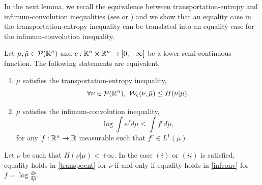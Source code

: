 \documentclass[a4paper,oneside,11pt]{article}
\begin{document}
 In the next lemma, we recall the equivalence between transportation-entropy and infimum-convolution inequalities (see \cite[Corollary 3.1]{GL} or \cite[Theorem 5.26]{Villani}) and we show that an equality case in the transportation-entropy inequality can be translated into an equality case for the infimum-convolution inequality.


\begin{Pro}\label{duality}
Let $\mu,\tilde \mu \in \mathcal{P}(\mathbb{R}^n)$ and $c : \mathbb{R}^n \times \mathbb{R}^n \to [0,+\infty]$ be a lower semi-continuous function. The following statements are equivalent.

\begin{enumerate}
\item[(i).] $\mu$ satisfies the transportation-entropy inequality,
\begin{equation} \label{transpoent}\forall \nu \in \mathcal{P}(\mathbb{R}^n), \  \mathcal{W}_c(\nu,\tilde \mu) \leq H(\nu| \mu). \end{equation}


\item[ (ii).] $\mu$ satisfies the infimum-convolution inequality,
\begin{equation} \label{infconv} \log \int e^f d\mu \leq \int  f^c d \tilde \mu,\end{equation}
for any $f : \mathbb{R}^n \to \mathbb{R}$ measurable such that $f^c \in L^1(\mu)$.
\end{enumerate}
Let $\nu$ be such that $H(\nu|\mu)<+\infty$. In the case $(i)$ or $(ii)$ is satisfied, equality holds in \eqref{transpoent} for $\nu$ if and only if  equality holds in \eqref{infconv} for $f = \log \frac{d \nu}{d\mu}$.
\end{Pro}
\end{document}
